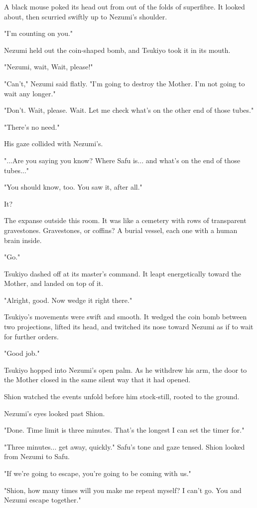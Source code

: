 A black mouse poked its head out from out of the folds of superfibre. It
looked about, then scurried swiftly up to Nezumi's shoulder.

"I'm counting on you."

Nezumi held out the coin-shaped bomb, and Tsukiyo took it in its mouth.

"Nezumi, wait, Wait, please!"

"Can't," Nezumi said flatly. "I'm going to destroy the Mother. I'm not
going to wait any longer."

"Don't. Wait, please. Wait. Let me check what's on the other end of
those tubes."

"There's no need."

His gaze collided with Nezumi's.

"...Are you saying you know? Where Safu is... and what's on the end of
those tubes..."

"You should know, too. You saw it, after all."

It?

The expanse outside this room. It was like a cemetery with rows of
transparent gravestones. Gravestones, or coffins? A burial vessel, each
one with a human brain inside.

"Go."

Tsukiyo dashed off at its master's command. It leapt energetically
toward the Mother, and landed on top of it.

"Alright, good. Now wedge it right there."

Tsukiyo's movements were swift and smooth. It wedged the coin bomb
between two projections, lifted its head, and twitched its nose toward
Nezumi as if to wait for further orders.

"Good job."

Tsukiyo hopped into Nezumi's open palm. As he withdrew his arm, the door
to the Mother closed in the same silent way that it had opened.

Shion watched the events unfold before him stock-still, rooted to the
ground.

Nezumi's eyes looked past Shion.

"Done. Time limit is three minutes. That's the longest I can set the
timer for."

"Three minutes... get away, quickly." Safu's tone and gaze tensed. Shion
looked from Nezumi to Safu.

"If we're going to escape, you're going to be coming with us."

"Shion, how many times will you make me repeat myself? I can't go. You
and Nezumi escape together."

